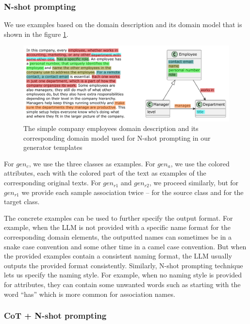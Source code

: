 \subsubsection{N-shot prompting}

We use examples based on the domain description and its domain model that is shown in the figure \ref{fig:prompting-domain}.

\begin{figure}[!h]
    \centering
    \includegraphics[scale=0.6]{img/prompting-domain.pdf}
    \caption{\centering The simple company employees domain description and its corresponding domain model used for N-shot prompting in our generator templates}
    \label{fig:prompting-domain}
\end{figure}


For $gen_c$, we use the three classes as examples. For $gen_a$, we use the colored attributes, each with the colored part of the text as examples of the corresponding original texts. For $gen_{r1}$ and ${gen_{r2}}$, we proceed similarly, but for ${gen_{r1}}$ we provide each sample association twice – for the source class and for the target class.

The concrete examples can be used to further specify the output format. For example, when the LLM is not provided with a specific name format for the corresponding domain elements, the outputted names can sometimes be in a snake case convention and some other time in a camel case convention. But when the provided examples contain a consistent naming format, the LLM usually outputs the provided format consistently. Similarly, N-shot prompting technique lets us specify the naming style. For example, when no naming style is provided for attributes, they can contain some unwanted words such as starting with the word ``has'' which is more common for association names.


\subsubsection{CoT + N-shot prompting}


